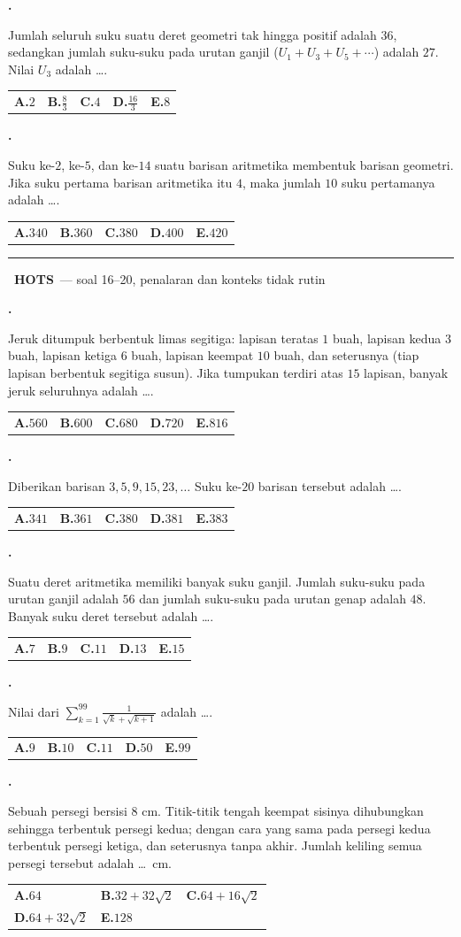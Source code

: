 \documentclass[a4paper,11pt]{article}
\newcommand{\dis}{\displaystyle}
\newcounter{no}
\newcommand{\tingkat}[2]{\par\Needspace{7\baselineskip}\vspace{0.6em}\noindent
  {\color{teal}\rule{3pt}{1.1em}}\ {\color{navy}\bfseries #1}\ {\small\color{gray}--- #2}\par\vspace{0.1em}}
\newcommand{\soal}[2]{\par\vspace{0.75em}\stepcounter{no}\noindent
  \begin{minipage}[t]{1.8em}\textbf{\theno.}\end{minipage}%
  \begin{minipage}[t]{\dimexpr\linewidth-1.8em\relax}#1\par\vspace{0.35em}#2\end{minipage}\par}
\begin{document}
\soal{Jumlah seluruh suku suatu deret geometri tak hingga positif adalah $36$, sedangkan jumlah suku-suku pada urutan ganjil ($U_1+U_3+U_5+\cdots$) adalah $27$. Nilai $U_3$ adalah \dots.}{\begin{tabularx}{\linewidth}{@{}*{5}{X}@{}}\textbf{A.}\;$2$ & \textbf{B.}\;$\dis\frac83$ & \textbf{C.}\;$4$ & \textbf{D.}\;$\dis\frac{16}{3}$ & \textbf{E.}\;$8$\end{tabularx}}
\soal{Suku ke-$2$, ke-$5$, dan ke-$14$ suatu barisan aritmetika membentuk barisan geometri. Jika suku pertama barisan aritmetika itu $4$, maka jumlah $10$ suku pertamanya adalah \dots.}{\begin{tabularx}{\linewidth}{@{}*{5}{X}@{}}\textbf{A.}\;$340$ & \textbf{B.}\;$360$ & \textbf{C.}\;$380$ & \textbf{D.}\;$400$ & \textbf{E.}\;$420$\end{tabularx}}
\tingkat{HOTS}{soal 16--20, penalaran dan konteks tidak rutin}
\soal{Jeruk ditumpuk berbentuk limas segitiga: lapisan teratas $1$ buah, lapisan kedua $3$ buah, lapisan ketiga $6$ buah, lapisan keempat $10$ buah, dan seterusnya (tiap lapisan berbentuk segitiga susun). Jika tumpukan terdiri atas $15$ lapisan, banyak jeruk seluruhnya adalah \dots.}{\begin{tabularx}{\linewidth}{@{}*{5}{X}@{}}\textbf{A.}\;$560$ & \textbf{B.}\;$600$ & \textbf{C.}\;$680$ & \textbf{D.}\;$720$ & \textbf{E.}\;$816$\end{tabularx}}
\soal{Diberikan barisan $3,5,9,15,23,\ldots$ Suku ke-$20$ barisan tersebut adalah \dots.}{\begin{tabularx}{\linewidth}{@{}*{5}{X}@{}}\textbf{A.}\;$341$ & \textbf{B.}\;$361$ & \textbf{C.}\;$380$ & \textbf{D.}\;$381$ & \textbf{E.}\;$383$\end{tabularx}}
\soal{Suatu deret aritmetika memiliki banyak suku ganjil. Jumlah suku-suku pada urutan ganjil adalah $56$ dan jumlah suku-suku pada urutan genap adalah $48$. Banyak suku deret tersebut adalah \dots.}{\begin{tabularx}{\linewidth}{@{}*{5}{X}@{}}\textbf{A.}\;$7$ & \textbf{B.}\;$9$ & \textbf{C.}\;$11$ & \textbf{D.}\;$13$ & \textbf{E.}\;$15$\end{tabularx}}
\soal{Nilai dari $\dis\sum_{k=1}^{99}\dis\frac{1}{\sqrt{k}+\sqrt{k+1}}$ adalah \dots.}{\begin{tabularx}{\linewidth}{@{}*{5}{X}@{}}\textbf{A.}\;$9$ & \textbf{B.}\;$10$ & \textbf{C.}\;$11$ & \textbf{D.}\;$50$ & \textbf{E.}\;$99$\end{tabularx}}
\soal{Sebuah persegi bersisi $8$ cm. Titik-titik tengah keempat sisinya dihubungkan sehingga terbentuk persegi kedua; dengan cara yang sama pada persegi kedua terbentuk persegi ketiga, dan seterusnya tanpa akhir. Jumlah keliling semua persegi tersebut adalah \dots\ cm.}{\begin{tabularx}{\linewidth}{@{}*{3}{X}@{}}\textbf{A.}\;$64$ & \textbf{B.}\;$32+32\sqrt2$ & \textbf{C.}\;$64+16\sqrt2$\\[3pt] \textbf{D.}\;$64+32\sqrt2$ & \textbf{E.}\;$128$ & \end{tabularx}}
\end{document}
